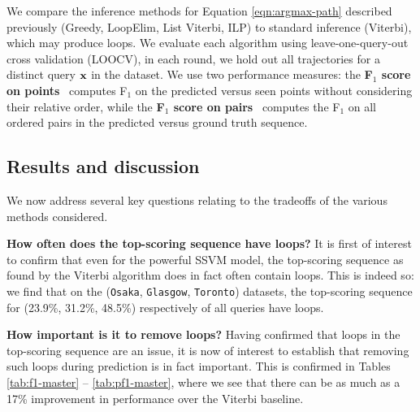 %

We compare the inference methods for Equation \ref{eqn:argmax-path} described previously ({\sc Greedy}, {\sc LoopElim}, {\sc List Viterbi}, {\sc ILP})
to standard inference ({\sc Viterbi}), which may produce loops.
We evaluate each algorithm using leave-one-query-out cross validation (LOOCV),
\ie in each round, we hold out all trajectories for a distinct query $\mathbf{x}$ in the dataset.
We use two performance measures:
the {\bf F$_1$ score on points}~\cite{ijcai15} computes F$_1$ on the predicted versus seen points
without considering their relative order,
while the {\bf F$_1$ score on pairs}~\cite{cikm16paper} computes the F$_1$ on all ordered pairs in the predicted versus ground truth sequence. %




%
\subsection{Results and discussion}

We now address several key questions relating to the tradeoffs of the various methods considered.

\textbf{How often does the top-scoring sequence have loops?}
It is first of interest to confirm that
even for the powerful SSVM model,
the top-scoring sequence as found by the Viterbi algorithm does in fact often contain loops.
This is indeed so: we find that on the ({\tt Osaka}, {\tt Glasgow}, {\tt Toronto}) datasets, the top-scoring sequence for (23.9\%, 31.2\%, 48.5\%) respectively of all queries have loops.

\textbf{How important is it to remove loops?}
Having confirmed that loops in the top-scoring sequence are an issue,
it is now of interest to establish that removing such loops during prediction is in fact important.
This is confirmed in Tables \ref{tab:f1-master} -- \ref{tab:pf1-master},
where we see that there can be as much as a 17\% improvement in performance over the {\sc Viterbi} baseline.

